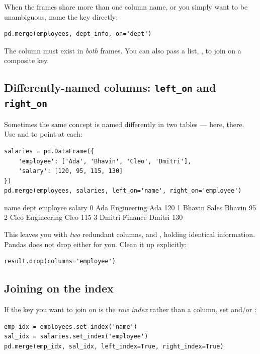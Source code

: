 \documentclass[11pt]{article}
\begin{document}
When the frames share more than one column name, or you simply want to be unambiguous, name the key directly:

\begin{lstlisting}
pd.merge(employees, dept_info, on='dept')
\end{lstlisting}

The  column must exist in \emph{both} frames. You can also pass a list, , to join on a composite key.

\subsection{Differently-named columns: \texttt{left\_on} and \texttt{right\_on}}

Sometimes the same concept is named differently in two tables ---  here,  there. Use  and  to point at each:

\begin{lstlisting}
salaries = pd.DataFrame({
    'employee': ['Ada', 'Bhavin', 'Cleo', 'Dmitri'],
    'salary': [120, 95, 115, 130]
})
pd.merge(employees, salaries, left_on='name', right_on='employee')
\end{lstlisting}

\begin{outblock}
     name         dept employee  salary
0     Ada  Engineering      Ada     120
1  Bhavin        Sales   Bhavin      95
2    Cleo  Engineering     Cleo     115
3  Dmitri      Finance   Dmitri     130
\end{outblock}

\begin{pitfall}
This leaves you with \emph{two} redundant columns,  and , holding identical information. Pandas does not drop either for you. Clean it up explicitly:
\begin{lstlisting}
result.drop(columns='employee')
\end{lstlisting}
\end{pitfall}

\subsection{Joining on the index}

If the key you want to join on is the \emph{row index} rather than a column, set  and/or :

\begin{lstlisting}
emp_idx = employees.set_index('name')
sal_idx = salaries.set_index('employee')
pd.merge(emp_idx, sal_idx, left_index=True, right_index=True)
\end{lstlisting}
\end{document}
